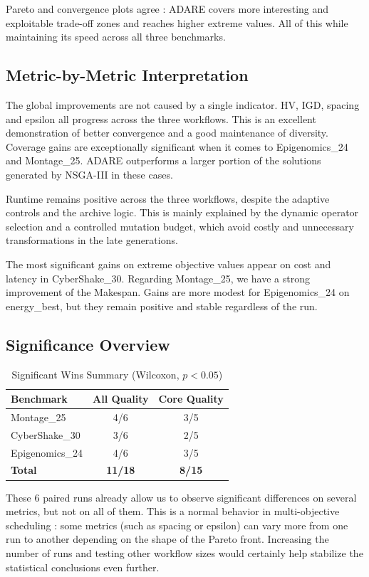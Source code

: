 \documentclass[conference]{IEEEtran}
\begin{document}
Pareto and convergence plots agree : ADARE covers more interesting and exploitable trade-off zones and reaches higher extreme values. All of this while maintaining its speed across all three benchmarks.

\subsection{Metric-by-Metric Interpretation}
The global improvements are not caused by a single indicator.
HV, IGD, spacing and epsilon all progress across the three workflows. This is an excellent demonstration of better convergence and a good maintenance of diversity.
Coverage gains are exceptionally significant when it comes to Epigenomics\_24 and Montage\_25. ADARE outperforms a larger portion of the solutions generated by NSGA-III in these cases.

Runtime remains positive across the three workflows, despite the adaptive controls and the archive logic.
This is mainly explained by the dynamic operator selection and a controlled mutation budget, which avoid costly and unnecessary transformations in the late generations.

The most significant gains on extreme objective values appear on cost and latency in CyberShake\_30. Regarding Montage\_25, we have a strong improvement of the Makespan.
Gains are more modest for Epigenomics\_24 on energy\_best, but they remain positive and stable regardless of the run.

\subsection{Significance Overview}
\begin{table}[htbp]
\centering
\caption{Significant Wins Summary (Wilcoxon, $p<0.05$)}
\label{tab:significance}
\begin{tabular}{lcc}
\toprule
\textbf{Benchmark} & \textbf{All Quality} & \textbf{Core Quality} \\
\midrule
Montage\_25 & 4/6 & 3/5 \\
CyberShake\_30 & 3/6 & 2/5 \\
Epigenomics\_24 & 4/6 & 3/5 \\
\midrule
\textbf{Total} & \textbf{11/18} & \textbf{8/15} \\
\bottomrule
\end{tabular}
\end{table}

These 6 paired runs already allow us to observe significant differences on several metrics, but not on all of them.
This is a normal behavior in multi-objective scheduling : some metrics (such as spacing or epsilon) can vary more from one run to another depending on the shape of the Pareto front.
Increasing the number of runs and testing other workflow sizes would certainly help stabilize the statistical conclusions even further.
\end{document}
